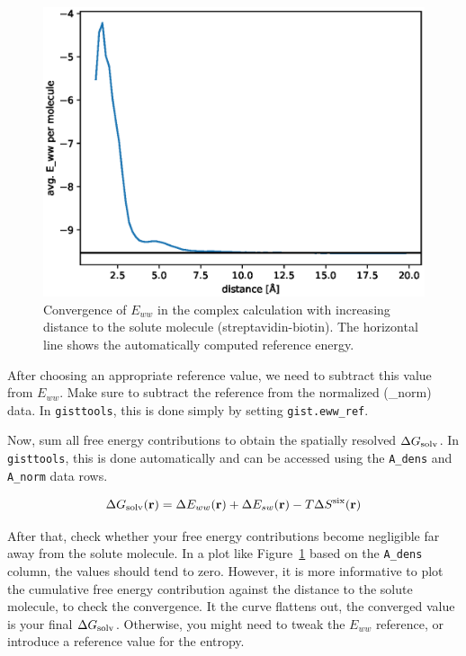 \documentclass[9pt,tutorial]{livecoms}
\newcommand{\dgsolv}{\Delta G_\textup{solv}}
\newcommand{\software}{\texttt}
\newcommand\inlinecode{\texttt}
\begin{document}
\begin{figure}
	\centering
	\includegraphics[width=0.8\linewidth]{figures/Eww_convergence.eps}
	\caption{Convergence of $E_{ww}$ in the complex calculation with increasing distance to the solute molecule (streptavidin-biotin). The horizontal line shows the automatically computed reference energy.}\label{fig_ewwref}
\end{figure}

After choosing an appropriate reference value, we need to subtract this value from $E_{ww}$.
Make sure to subtract the reference from the normalized (\_norm) data.
In \software{gisttools}, this is done simply by setting \inlinecode{gist.eww\_ref}.

Now, sum all free energy contributions to obtain the spatially resolved $\dgsolv$.
In \software{gisttools}, this is done automatically and can be accessed using the \inlinecode{A\_dens} and \inlinecode{A\_norm} data rows.

\newcommand{\coordinate}{\mathbf{r}}
\begin{equation}
	\dgsolv(\coordinate) = \Delta E_{ww}(\coordinate) + \Delta E_{sw}(\coordinate) - T\Delta S^\text{six}(\coordinate)
\end{equation}

After that, check whether your free energy contributions become negligible far away from the solute molecule.
In a plot like Figure~\ref{fig_ewwref} based on the \inlinecode{A\_dens} column, the values should tend to zero.
However, it is more informative to plot the cumulative free energy contribution against the distance to the solute molecule, to check the convergence.
It the curve flattens out, the converged value is your final $\dgsolv$\@.
Otherwise, you might need to tweak the $E_{ww}$ reference, or introduce a reference value for the entropy.
\end{document}
